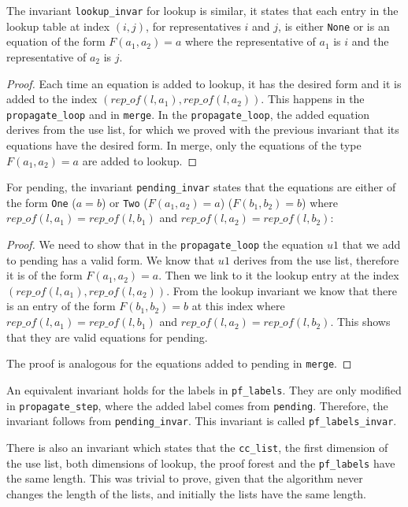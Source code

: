The invariant \lstinline|lookup_invar| for lookup is similar, it states that each entry in the lookup table at index $(i, j)$, for representatives $i$ and $j$, is either \lstinline{None} or is an equation of the form $F(a_1, a_2) = a$ where the representative of $a_1$ is $i$ and the representative of $a_2$ is $j$.

\begin{proof}
Each time an equation is added to lookup, it has the desired form and it is added to the index $(rep\_of(l, a_1), rep\_of(l, a_2))$. This happens in the \lstinline{propagate_loop} and in \lstinline{merge}. In the \lstinline{propagate_loop}, the added equation derives from the use list, for which we proved with the previous invariant that its equations have the desired form. In merge, only the equations of the type $F(a_1, a_2) = a$ are added to lookup.
\end{proof}

For pending, the invariant \lstinline|pending_invar| states that the equations are either of the form \lstinline{One} ($a = b$) or \lstinline{Two} ($F(a_1, a_2) = a$) ($F(b_1, b_2) = b$) where $rep\_of(l, a_1) = rep\_of(l, b_1)$ and $rep\_of(l, a_2) = rep\_of(l, b_2)$:

\begin{proof}
We need to show that in the \lstinline{propagate_loop} the equation $u1$ that we add to pending has a valid form. We know that $u1$ derives from the use list, therefore it is of the form $F(a_1, a_2) = a$. Then we link to it the lookup entry at the index $(rep\_of(l, a_1), rep\_of(l, a_2))$. From the lookup invariant we know that there is an entry of the form $F(b_1, b_2) = b$ at this index where $rep\_of(l, a_1) = rep\_of(l, b_1)$ and $rep\_of(l, a_2) = rep\_of(l, b_2)$. This shows that they are valid equations for pending.

The proof is analogous for the equations added to pending in \lstinline{merge}.
\end{proof}

An equivalent invariant holds for the labels in \lstinline|pf_labels|. They are only modified in \lstinline|propagate_step|, where the added label comes from \lstinline|pending|.
Therefore, the invariant follows from \lstinline|pending_invar|. This invariant is called \lstinline|pf_labels_invar|.

There is also an invariant which states that the \lstinline{cc_list}, the first dimension of the use list, both dimensions of lookup, the proof forest and the \lstinline{pf_labels} have the same length. This was trivial to prove, given that the algorithm never changes the length of the lists, and initially the lists have the same length.

